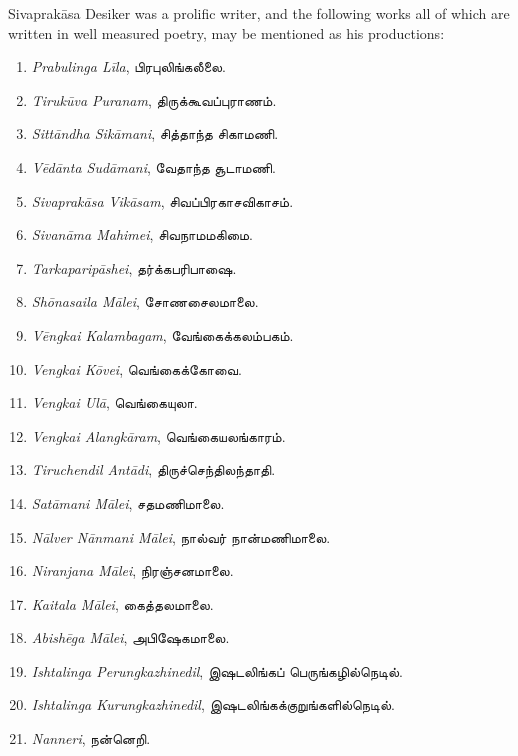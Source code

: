 \documentclass{article}
\newcommand{\TamilText}[1]{\texttamil{#1}}
\newcommand{\tam}[1]{\TamilText{#1}}
\begin{document}
Sivaprak\={a}sa Desiker was a prolific writer, and the following works all of which are written in well measured poetry, may be mentioned as his productions:
\begin{enumerate}\small
    \item \emph{Prabulinga L\={i}la}, \tam{பிரபுலிங்கலீலை}.

    \item \emph{Tiruk\={u}va Puranam}, \tam{திருக்கூவப்புராணம்}.

    \item \emph{Sitt\={a}ndha Sik\={a}mani}, \tam{சித்தாந்த சிகாமணி}.

    \item \emph{V\={e}d\={a}nta Sud\={a}mani}, \tam{வேதாந்த சூடாமணி}.

    \item \emph{Sivaprak\={a}sa Vik\={a}sam}, \tam{சிவப்பிரகாசவிகாசம்}.

    \item \emph{Sivan\={a}ma Mahimei}, \tam{சிவநாமமகிமை}.

    \item \emph{Tarkaparip\={a}shei}, \tam{தர்க்கபரிபாஷை}.

    \item \emph{Sh\={o}nasaila M\={a}lei}, \tam{சோணசைலமாலை}.

    \item \emph{V\={e}ngkai Kalambagam}, \tam{வேங்கைக்கலம்பகம்}.

    \item \emph{Vengkai K\={o}vei}, \tam{வெங்கைக்கோவை}.

    \item \emph{Vengkai Ul\={a}}, \tam{வெங்கையுலா}.

    \item \emph{Vengkai Alangk\={a}ram}, \tam{வெங்கையலங்காரம்}.

    \item \emph{Tiruchendil Ant\={a}di}, \tam{திருச்செந்திலந்தாதி}.

    \item \emph{Sat\={a}mani M\={a}lei}, \tam{சதமணிமாலை}.

    \item \emph{N\={a}lver N\={a}nmani M\={a}lei}, \tam{நால்வர் நான்மணிமாலை}.

    \item \emph{Niranjana M\={a}lei}, \tam{நிரஞ்சனமாலை}.

    \item \emph{Kaitala M\={a}lei}, \tam{கைத்தலமாலை}.

    \item \emph{Abish\={e}ga M\={a}lei}, \tam{அபிஷேகமாலை}.

    \item \emph{Ishtalinga Perungkazhinedil}, \tam{இஷடலிங்கப் பெருங்கழில்நெடில்}.

    \item \emph{Ishtalinga Kurungkazhinedil}, \tam{இஷடலிங்கக்குறுங்களில்நெடில்}.

    \item \emph{Nanneri}, \tam{நன்னெறி}.
\end{enumerate}
\end{document}
